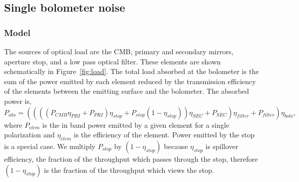 \documentclass[]{spie}  %
\begin{document}
\subsection{Single bolometer noise}
\label{sec:det_noise}

\subsubsection{Model}

The sources of optical load are the CMB, primary and secondary mirrors, aperture stop, and a low pass optical filter.  These elements 
are shown schematically in Figure~\ref{fig:load}. 
%
The total load absorbed at the bolometer is the sum of the power emitted by each element reduced by the transmission efficiency of the elements between 
the emitting surface and the bolometer.  
The absorbed power is,
\begin{equation}
\label{eq:load}
P_{abs} =  (((( P_{CMB} \eta_{PRI} + P_{PRI} ) \eta_{stop} + P_{stop}(1-\eta_{stop}) ) \eta_{SEC} + P_{SEC})\eta_{filter} + P_{filter}) \eta_{bolo},
\end{equation} 
where $P_{elem}$ is the in band power emitted by a given element for a single polarization and $\eta_{elem}$ is the efficiency 
of the element. %
Power emitted by the stop is a special case. We multiply $P_{stop}$ by 
$(1-\eta_{stop})$ because $\eta_{stop}$ is spillover efficiency, the fraction of the throughput which passes through the stop, therefore $(1-\eta_{stop})$ 
is the fraction of the throughput which views the stop.  
\end{document}
